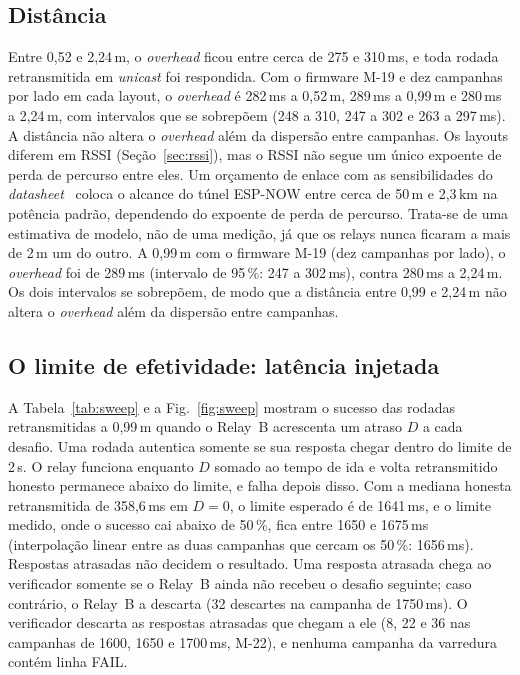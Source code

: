 \documentclass{ieeeaccess}
\begin{document}
\subsection{Distância}

Entre 0,52 e 2,24\,m, o \emph{overhead} ficou entre cerca de 275 e 310\,ms, e toda rodada retransmitida em \emph{unicast} foi respondida. Com o firmware M-19 e dez campanhas por lado em cada layout, o \emph{overhead} é 282\,ms a 0,52\,m, 289\,ms a 0,99\,m e 280\,ms a 2,24\,m, com intervalos que se sobrepõem (248 a 310, 247 a 302 e 263 a 297\,ms). A distância não altera o \emph{overhead} além da dispersão entre campanhas. Os layouts diferem em RSSI (Seção~\ref{sec:rssi}), mas o RSSI não segue um único expoente de perda de percurso entre eles. Um orçamento de enlace com as sensibilidades do \emph{datasheet}~\cite{b29} coloca o alcance do túnel ESP-NOW entre cerca de 50\,m e 2,3\,km na potência padrão, dependendo do expoente de perda de percurso. Trata-se de uma estimativa de modelo, não de uma medição, já que os relays nunca ficaram a mais de 2\,m um do outro. A 0,99\,m com o firmware M-19 (dez campanhas por lado), o \emph{overhead} foi de 289\,ms (intervalo de 95\,\%: 247 a 302\,ms), contra 280\,ms a 2,24\,m. Os dois intervalos se sobrepõem, de modo que a distância entre 0,99 e 2,24\,m não altera o \emph{overhead} além da dispersão entre campanhas.

\subsection{O limite de efetividade: latência injetada}
\label{sec:sweep}

A Tabela~\ref{tab:sweep} e a Fig.~\ref{fig:sweep} mostram o sucesso das rodadas retransmitidas a 0,99\,m quando o Relay~B acrescenta um atraso $D$ a cada desafio. Uma rodada autentica somente se sua resposta chegar dentro do limite de 2\,s. O relay funciona enquanto $D$ somado ao tempo de ida e volta retransmitido honesto permanece abaixo do limite, e falha depois disso. Com a mediana honesta retransmitida de 358,6\,ms em $D=0$, o limite esperado é de 1641\,ms, e o limite medido, onde o sucesso cai abaixo de 50\,\%, fica entre 1650 e 1675\,ms (interpolação linear entre as duas campanhas que cercam os 50\,\%: 1656\,ms). Respostas atrasadas não decidem o resultado. Uma resposta atrasada chega ao verificador somente se o Relay~B ainda não recebeu o desafio seguinte; caso contrário, o Relay~B a descarta (32 descartes na campanha de 1750\,ms). O verificador descarta as respostas atrasadas que chegam a ele (8, 22 e 36 nas campanhas de 1600, 1650 e 1700\,ms, M-22), e nenhuma campanha da varredura contém linha FAIL.
\end{document}
